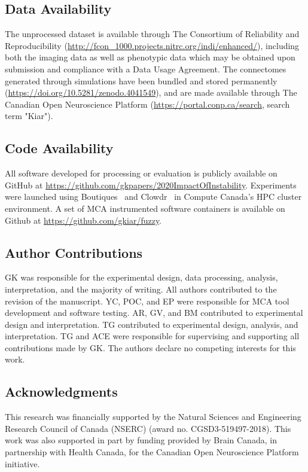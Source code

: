 \documentclass[fleqn,10pt]{SelfArx} %
\begin{document}
\subsection*{Data Availability}
The unprocessed dataset is available through The Consortium of Reliability and Reproducibility
(\url{http://fcon_1000.projects.nitrc.org/indi/enhanced/}), including both the imaging data as well as phenotypic data
which may be obtained upon submission and compliance with a Data Usage Agreement. The connectomes generated through
simulations have been bundled and stored permanently (\url{https://doi.org/10.5281/zenodo.4041549}), and are made
available through The Canadian Open Neuroscience Platform (\url{https://portal.conp.ca/search}, search term "Kiar").

\subsection*{Code Availability}
All software developed for processing or evaluation is publicly available on GitHub at
\url{https://github.com/gkpapers/2020ImpactOfInstability}. Experiments were launched using
Boutiques~\cite{Glatard2018-tu} and Clowdr~\cite{Kiar2019-sr} in Compute Canada's HPC cluster environment. A set of MCA
instrumented software containers is available on Github at \url{https://github.com/gkiar/fuzzy}. 

\subsection*{Author Contributions}
GK was responsible for the experimental design, data processing, analysis, interpretation, and the majority of writing.
All authors contributed to the revision of the manuscript. YC, POC, and EP were responsible for MCA tool development
and software testing. AR, GV, and BM contributed to experimental design and interpretation. TG contributed to
experimental design, analysis, and interpretation. TG and ACE were responsible for supervising and supporting all
contributions made by GK. The authors declare no competing interests for this work.

\subsection*{Acknowledgments} 
This research was financially supported by the Natural Sciences and Engineering Research Council of Canada (NSERC)
(award no. CGSD3-519497-2018). This work was also supported in part by funding provided by Brain Canada, in partnership
with Health Canada, for the Canadian Open Neuroscience Platform initiative.
\end{document}
